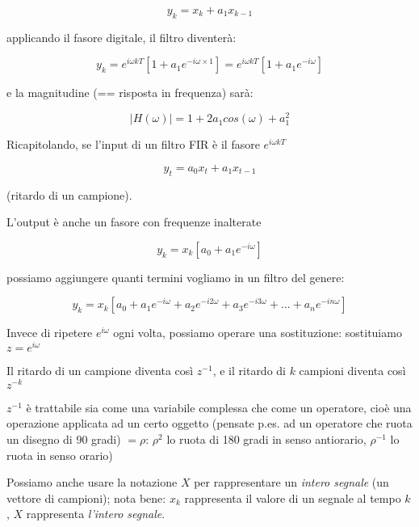 		 \begin{equation}
		   y_k = x_k + a_1 x_{k-1}
		 \end{equation}

	  applicando il fasore digitale, il filtro diventer\`a:

		 \begin{equation}
	  	  y_k = e^{i\omega kT} [ 1 + a_1 e^{-i\omega \times 1} ] = e^{i \omega kT} [ 1 + a_1 e^{-i \omega } ]
		 \end{equation}

		e la magnitudine (== risposta in frequenza) sar\`a:

		 \begin{equation}
		  |H( \omega )| = 1 + 2 a_1 cos( \omega ) + a_1^2
		 \end{equation}

	Ricapitolando, se l'input di un filtro FIR \`e il fasore $e^{i \omega kT}$

		 \begin{equation}
	   y_t = a_0 x_t + a_1 x_{t-1}
		 \end{equation}

    (ritardo di un campione).

		L'output \`e anche un fasore con frequenze inalterate

		 \begin{equation}
		 y_k = x_k \left [ a_0 + a_1 e^{-i \omega} \right ]
		 \end{equation}

		possiamo aggiungere quanti termini vogliamo in un filtro del genere:

		 \begin{equation}
		 y_k = x_k \left [ a_0 + a_1 e^{-i\omega } + a_2 e^{-i2\omega } + a_3 e^{-i3\omega } + ... + a_n e^{-in\omega } \right ]
		 \end{equation}


	Invece di ripetere $e^{i\omega}$ ogni volta, possiamo operare una sostituzione: sostituiamo $z = e^{i \omega}$

	Il ritardo di un campione diventa cos\`i $z^{-1}$, e il ritardo di $k$ campioni
		diventa cos\`i $z^{-k}$

	$z^{-1}$ \`e trattabile sia come una variabile complessa che come un
		operatore, cio\`e una operazione applicata ad un certo oggetto (pensate
		p.es. ad un operatore che ruota un disegno di 90 gradi) $= \rho$: $\rho^2$ lo
		ruota di 180 gradi in senso antiorario, $\rho^{-1}$ lo ruota in senso orario)

	Possiamo anche usare la notazione $X$ per rappresentare un \emph{intero segnale}
		(un vettore di campioni); nota bene: $x_k$ rappresenta il valore di un
		segnale al tempo $k$, $X$ rappresenta \emph{l'intero segnale}.

